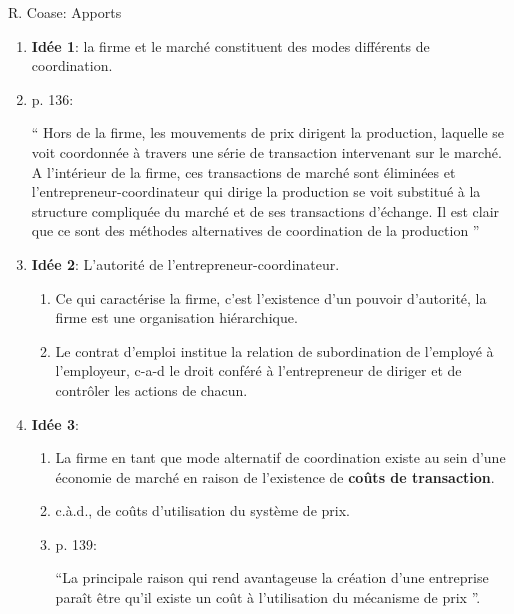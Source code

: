 \begin{frame}[allowframebreaks]{R. Coase: Apports}
\begin{itemize}
         \begin{enumerate}[$\star$]
            \item \textbf{Idée 1}: la firme et le marché constituent des modes différents de coordination.
            \item  p. 136:
            \begin{mdframed}
                “ Hors de la firme, les mouvements de prix dirigent la production, 
                laquelle se voit coordonnée à travers une série de transaction intervenant
                 sur le marché. A l’intérieur de la firme, ces transactions de marché sont éliminées 
                 et l’entrepreneur-coordinateur qui dirige la production se voit substitué à la 
                 structure compliquée du marché et de ses transactions d’échange.
                  Il est clair que ce sont des méthodes alternatives de coordination de la production ”
            \end{mdframed}
            \framebreak
            \item \textbf{Idée 2}: L’autorité de l’entrepreneur-coordinateur.
            \begin{enumerate}[$\star$]
                \item Ce qui caractérise la firme, c’est l’existence d’un pouvoir
                  d’autorité, la firme est une organisation hiérarchique.
                \item  Le contrat d’emploi institue la relation de subordination de 
                l’employé à l’employeur, c-a-d le droit conféré à l’entrepreneur de
                 diriger et de contrôler les actions de chacun.
            \end{enumerate}
            \item \textbf{Idée 3}: 
            \begin{enumerate}[$\star$]
            \item La firme en tant que mode alternatif de coordination existe au sein d’une économie 
            de marché en raison de l’existence de \textbf{coûts de transaction}.  
            \item c.à.d., de coûts d’utilisation du système de prix.   
            \item p. 139:
            \begin{mdframed}
                “La principale raison qui rend avantageuse la création d’une entreprise 
                paraît être qu’il existe un coût à l’utilisation du mécanisme de prix ”.
            \end{mdframed}

\end{enumerate}
\end{enumerate}
\end{itemize}
\end{frame}
